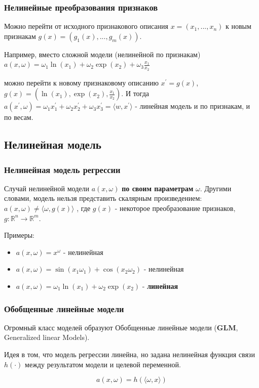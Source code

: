 \documentclass{beamer}
\begin{document}
	\begin{frame}
		\frametitle{Нелинейные преобразования признаков}
		Можно перейти от исходного признакового описания $x = (x_1, ..., x_n)$  к новым признакам $g(x) = (g_1(x), ..., g_m(x))$.
		
		\vspace{15pt}
		
		Например, вместо сложной модели (нелинейной по признакам)
		$a(x, \omega) = \omega_1 \ln(x_1) + \omega_2 \exp(x_2) + \omega_3 \frac{x_1}{x_2}$
		
		можно перейти к новому признаковому описанию $x^{'} = g(x)$, $g(x) = (\ln(x_1), \exp(x_2), \frac{x_1}{x_2})$.
		И тогда $a(x^{'}, \omega) = \omega_1 x_1^{'} + \omega_2 x_2^{'} + \omega_3 x_3^{'} = \langle w, x^{'} \rangle$ - линейная модель и по признакам, и по весам.
	\end{frame}
	
	\subsection{Нелинейная модель}
	
	\begin{frame}
		\frametitle{Нелинейная модель регрессии}
		Случай нелинейной модели $a(x, \omega)$ \textbf{по своим параметрам} $\omega$. Другими словами, модель нельзя представить скалярным произведением: $a(x, \omega) \ne \langle \omega, g(x) \rangle$ , где $g(x)$ - некоторое преобразование признаков, $g: \mathbb{R}^n \rightarrow \mathbb{R}^m$.
		
		\vspace{15pt}
		
		Примеры:
		\begin{itemize}
			\item $a(x, \omega) = x^{\omega}$ - нелинейная
			\item $a(x, \omega) = \sin(x_1 \omega_1) + \cos(x_2 \omega_2)$ - нелинейная
			\item $a(x, \omega) = \omega_1 \ln(x_1) + \omega_2 \exp(x_2)$ - \textbf{линейная}
		\end{itemize}
	\end{frame}
	
	
	\begin{frame}
		\frametitle{Обобщенные линейные модели}
		Огромный класс моделей образуют Обобщенные линейные модели (\textbf{GLM}, Generalized linear Models).
		
		\vspace{5pt}
		
		Идея в том, что модель регрессии линейна, но задана нелинейная функция связи $h(\cdot)$ между результатом модели и целевой переменной.
		
		\[
		a(x, \omega) = h(\langle \omega, x \rangle)
		\]
	\end{frame}
	
\end{document}
